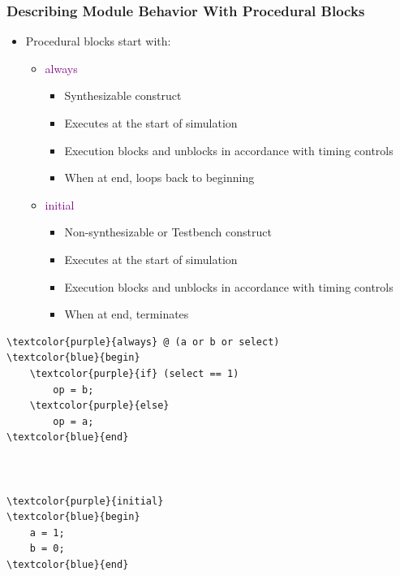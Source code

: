 \documentclass[t]{beamer}
\begin{document}
\begin{frame}[fragile]
\frametitle{Describing Module Behavior With Procedural Blocks}

\begin{multicols}{2}
\begin{itemize}
\item Procedural blocks start with:
\begin{itemize}
	\item \textcolor{purple}{always}
	\begin{itemize}
		\item Synthesizable construct
		\item Executes at the start of simulation
		\item Execution blocks and unblocks in accordance with timing controls
		\item When at end, loops back to beginning
	\end{itemize}
\end{itemize}
\begin{itemize}
	\item \textcolor{purple}{initial}
	\begin{itemize}
		\item Non-synthesizable  or Testbench construct
		\item Executes at the start of simulation
		\item Execution blocks and unblocks in accordance with timing controls
		\item When at end, terminates
	\end{itemize}
\end{itemize}
\end{itemize}

\columnbreak
{\footnotesize%
\begin{Verbatim}[commandchars=\\\{\}, tabsize=2]
\textcolor{purple}{always} @ (a or b or select)
\textcolor{blue}{begin}
	\textcolor{purple}{if} (select == 1)
		op = b;
	\textcolor{purple}{else}
		op = a;
\textcolor{blue}{end}



\textcolor{purple}{initial}
\textcolor{blue}{begin}
	a = 1;
	b = 0;
\textcolor{blue}{end}
\end{Verbatim}
}
\end{multicols}
\end{frame}
\end{document}
